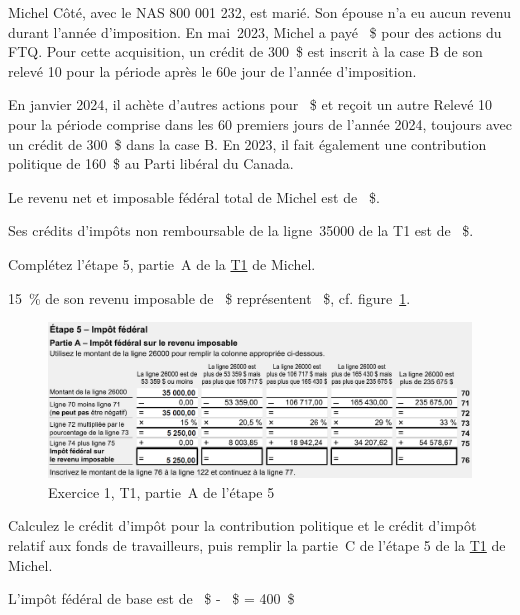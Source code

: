 \begin{question}
	Michel Côté, avec le NAS 800 001 232, est marié. Son épouse n'a eu aucun revenu durant l'année d'imposition. En mai~2023, Michel a payé ~\$ pour des actions du FTQ. Pour cette acquisition, un crédit de 300~\$ est inscrit à la case B de son relevé 10 pour la période après le 60e jour de l'année d'imposition. 
	
	En janvier 2024, il achète d'autres actions pour ~\$ et reçoit un autre Relevé 10 pour la période comprise dans les 60 premiers jours de l'année 2024, toujours avec un crédit de 300~\$ dans la case B. En 2023, il fait également une contribution politique de 160~\$ au Parti libéral du Canada.
	
	Le revenu net et imposable fédéral total de Michel est de ~\$.
	
	Ses crédits d'impôts non remboursable de la ligne~35000 de la T1 est de ~\$.
\end{question}
\setcounter{sousQuestion}{0}
\begin{sousQuestion}
	Complétez l'étape 5, partie~A de la \href{https://www.canada.ca/fr/agence-revenu/services/formulaires-publications/trousses-impot-toutes-annees-imposition/trousse-generale-impot-prestations/quebec/5005-r.html}{T1} de Michel.
\end{sousQuestion}
15~\% de son revenu imposable de ~\$ représentent ~\$, cf. figure~\ref{fig:chap5Exercice1Q8T15A}.
\begin{figure}
	\centering
	\includegraphics[width=.9\textwidth]{exercice/5-1/Q8/T1-5A.png}
	\caption[]{Exercice 1, T1, partie~A de l'étape 5}
	\label{fig:chap5Exercice1Q8T15A}
\end{figure}

\begin{sousQuestion}
	Calculez le crédit d'impôt pour la contribution politique et le crédit d'impôt relatif aux fonds de travailleurs, puis remplir la partie~C de l'étape 5 de la \href{https://www.canada.ca/fr/agence-revenu/services/formulaires-publications/trousses-impot-toutes-annees-imposition/trousse-generale-impot-prestations/quebec/5005-r.html}{T1} de Michel.
\end{sousQuestion}
L'impôt fédéral de base est de ~\$ - ~\$ = 400~\$

